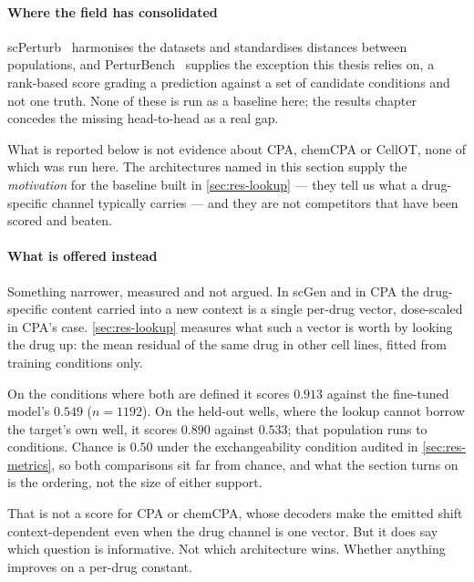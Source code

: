 \paragraph{Where the field has consolidated}
scPerturb~\cite{scperturb} harmonises the datasets and standardises distances
between populations, and PerturBench~\cite{perturbench} supplies the
exception this thesis relies on, a rank-based score grading a prediction against
a set of candidate conditions and not one truth. None of these is run as a
baseline here; the results chapter concedes the missing head-to-head as a real
gap.

\begin{scopelimit}
What is reported below is not evidence about CPA, chemCPA or CellOT, none of
which was run here. The architectures named in this section supply the
\emph{motivation} for the baseline built in \cref{sec:res-lookup} --- they tell
us what a drug-specific channel typically carries --- and they are not
competitors that have been scored and beaten.
\end{scopelimit}

\paragraph{What is offered instead} Something narrower, measured and not argued.
In scGen and in CPA the drug-specific content carried into a new context is a
single per-drug vector, dose-scaled in CPA's case. \cref{sec:res-lookup}
measures what such a vector is worth by looking the drug up: the mean residual of
the same drug in other cell lines, fitted from training conditions
only.

On the conditions where both are defined it scores $0.913$ against the fine-tuned
model's $0.549$ ($n = \num{1192}$). On the held-out wells, where the lookup cannot
borrow the target's own well, it scores $0.890$ against $0.533$; that population
runs to  conditions. Chance is $0.50$ under the
exchangeability condition audited in \cref{sec:res-metrics}, so both comparisons
sit far from chance, and what the section turns
on is the ordering, not the size of either support.

That is not a score for CPA or chemCPA, whose decoders make the emitted shift
context-dependent even when the drug channel is one vector. But it does say which
question is informative. Not which architecture wins. Whether anything improves
on a per-drug constant.


